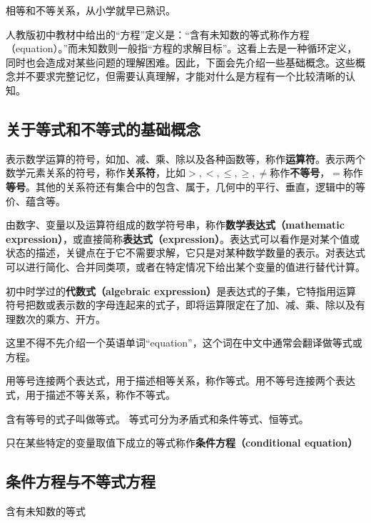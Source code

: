 
\begin{issues}
\issueDraft
\end{issues}

相等和不等关系，从小学就早已熟识。

人教版初中教材中给出的“方程”定义是：“含有未知数的等式称作方程（equation）。”而未知数则一般指“方程的求解目标”。这看上去是一种循环定义，同时也会造成对某些问题的理解困难。因此，下面会先介绍一些基础概念。这些概念并不要求完整记忆，但需要认真理解，才能对什么是方程有一个比较清晰的认知。

\subsection{关于等式和不等式的基础概念}



表示数学运算的符号，如加、减、乘、除以及各种函数等，称作\textbf{运算符}。表示两个数学元素关系的符号，称作\textbf{关系符}，比如$>,<,\leq,\geq,\neq$称作\textbf{不等号}，$=$称作\textbf{等号}。其他的关系符还有集合中的包含、属于，几何中的平行、垂直，逻辑中的等价、蕴含等。

由数字、变量以及运算符组成的数学符号串，称作\textbf{数学表达式（mathematic expression）}，或直接简称\textbf{表达式（expression）}。表达式可以看作是对某个值或状态的描述，关键点在于它不需要求解，它只是对某种数学数量的表示。对表达式可以进行简化、合并同类项，或者在特定情况下给出某个变量的值进行替代计算。

初中时学过的\textbf{代数式（algebraic expression）}是表达式的子集，它特指用运算符号把数或表示数的字母连起来的式子，即将运算限定在了加、减、乘、除以及有理数次的乘方、开方。

这里不得不先介绍一个英语单词“equation”，这个词在中文中通常会翻译做等式或方程。

用等号连接两个表达式，用于描述相等关系，称作等式。用不等号连接两个表达式，用于描述不等关系，称作不等式。%

含有等号的式子叫做等式。 等式可分为矛盾式和条件等式、恒等式。

只在某些特定的变量取值下成立的等式称作\textbf{条件方程（conditional equation）}

\subsection{条件方程与不等式方程}

含有未知数的等式


